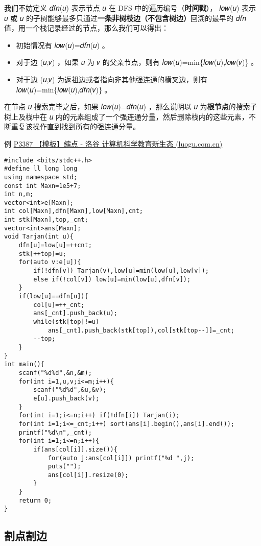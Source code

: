 \documentclass[]{article}
\providecommand{\tightlist}{%
  \setlength{\itemsep}{0pt}\setlength{\parskip}{0pt}}
\begin{document}
我们不妨定义 𝑑𝑓𝑛(𝑢) 表示节点 𝑢 在 DFS 中的遍历编号（\textbf{时间戳}），
𝑙𝑜𝑤(𝑢) 表示 𝑢 或 𝑢
的子树能够最多只通过\textbf{一条非树枝边（不包含树边）}回溯的最早的 𝑑𝑓𝑛
值，用一个栈记录经过的节点，那么我们可以得出：

\begin{itemize}
\tightlist
\item
  初始情况有 𝑙𝑜𝑤(𝑢)=𝑑𝑓𝑛(𝑢) 。
\item
  对于边 (𝑢,𝑣) ，如果 𝑢 为 𝑣 的父亲节点，则有
  𝑙𝑜𝑤(𝑢)=min\{𝑙𝑜𝑤(𝑢),𝑙𝑜𝑤(𝑣)\} 。
\item
  对于边 (𝑢,𝑣) 为返祖边或者指向非其他强连通的横叉边，则有
  𝑙𝑜𝑤(𝑢)=min\{𝑙𝑜𝑤(𝑢),𝑑𝑓𝑛(𝑣)\} 。
\end{itemize}

在节点 𝑢 搜索完毕之后，如果 𝑙𝑜𝑤(𝑢)=𝑑𝑓𝑛(𝑢) ，那么说明以 𝑢
为\textbf{根节点}的搜索子树上及栈中在 𝑢
内的元素组成了一个强连通分量，然后删除栈内的这些元素，不断重复该操作直到找到所有的强连通分量。

例 \href{https://www.luogu.com.cn/problem/P3387}{P3387 【模板】缩点 -
洛谷 \textbar{} 计算机科学教育新生态 (luogu.com.cn)}

\begin{verbatim}
#include <bits/stdc++.h>
#define ll long long
using namespace std;
const int Maxn=1e5+7;
int n,m;
vector<int>e[Maxn];
int col[Maxn],dfn[Maxn],low[Maxn],cnt;
int stk[Maxn],top,_cnt;
vector<int>ans[Maxn];
void Tarjan(int u){
    dfn[u]=low[u]=++cnt;
    stk[++top]=u;
    for(auto v:e[u]){
        if(!dfn[v]) Tarjan(v),low[u]=min(low[u],low[v]);
        else if(!col[v]) low[u]=min(low[u],dfn[v]);
    }
    if(low[u]==dfn[u]){
        col[u]=++_cnt;
        ans[_cnt].push_back(u);
        while(stk[top]!=u)  
            ans[_cnt].push_back(stk[top]),col[stk[top--]]=_cnt;
        --top;
    }
}
int main(){
    scanf("%d%d",&n,&m);
    for(int i=1,u,v;i<=m;i++){
        scanf("%d%d",&u,&v);
        e[u].push_back(v);
    }
    for(int i=1;i<=n;i++) if(!dfn[i]) Tarjan(i);
    for(int i=1;i<=_cnt;i++) sort(ans[i].begin(),ans[i].end());
    printf("%d\n",_cnt);
    for(int i=1;i<=n;i++){
        if(ans[col[i]].size()){
            for(auto j:ans[col[i]]) printf("%d ",j);
            puts("");
            ans[col[i]].resize(0);
        }
    }
    return 0;
}
\end{verbatim}

\hypertarget{ux5272ux70b9ux5272ux8fb9}{%
\subsection{割点割边}\label{ux5272ux70b9ux5272ux8fb9}}
\end{document}
